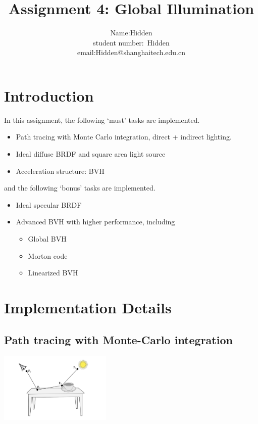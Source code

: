 \documentclass[acmtog]{acmart}
\title{Assignment 4: {Global Illumination}}
\author{Name:\quad Hidden \\ student number:\ Hidden
\\email:\quad Hidden@shanghaitech.edu.cn}
\begin{document}
\maketitle

\vspace*{2 ex}

\section{Introduction}

In this assignment, the following `must' tasks are implemented.

\begin{itemize}
	\item Path tracing with Monte Carlo integration, direct + indirect lighting.
	\item Ideal diffuse BRDF and square area light source
	\item Acceleration structure: BVH
\end{itemize}

and the following `bonus' tasks are implemented.

\begin{itemize}
	\item Ideal specular BRDF
	\item Advanced BVH with higher performance, including
	\begin{itemize}
		\item Global BVH
		\item Morton code
		\item Linearized BVH
	\end{itemize} 
\end{itemize}

\section{Implementation Details}

\subsection{Path tracing with Monte-Carlo integration}

\begin{center}
	\includegraphics[width=0.4\textwidth]{pictures/path-sampling.jpg}
\end{center}
\end{document}
